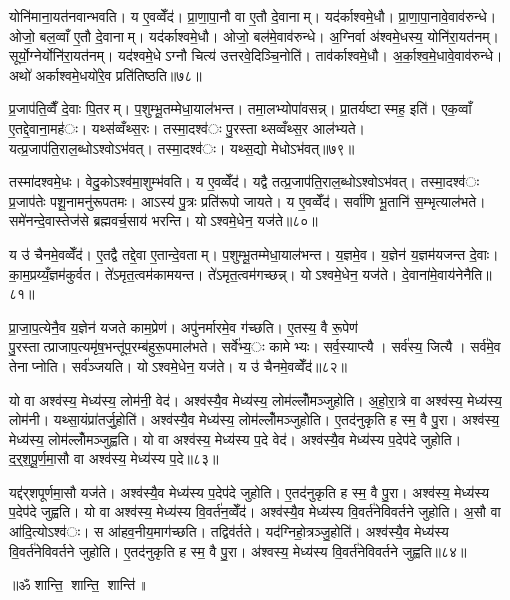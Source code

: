 योनि॑माना॒यत॑नवान्भवति। य ए॒वव्वेँद॑। प्रा॒णा॒पा॒नौ वा ए॒तौ दे॒वानाम्। यद॑र्काश्वमे॒धौ। प्रा॒णा॒पा॒नावे॒वाव॑रुन्धे। ओजो॒ बल॒व्वाँ ए॒तौ दे॒वानाम्। यद॑र्काश्वमे॒धौ। ओजो॒ बल॑मे॒वाव॑रुन्धे। अ॒ग्निर्वा अ॑श्वमे॒धस्य॒ योनि॑रा॒यत॑नम्। सूर्यो॒ग्नेर्योनि॑रा॒यत॑नम्। यद॑श्वमे॒धेऽग्नौ चित्य॑ उत्तरवे॒दिञ्चि॒नोति॑। ताव॑र्काश्वमे॒धौ। अ॒र्का॒श्व॒मे॒धावे॒वाव॑रुन्धे। अथो॑ अर्काश्वमे॒धयो॑रे॒व प्रति॑तिष्ठति॥७८॥


प्र॒जाप॑ति॒व्वैँ दे॒वाः पि॒तरम्। प॒शुम्भू॒तम्मेधा॒याल॑भन्त। तमा॒लभ्योपा॑वसन्न्। प्रा॒तर्यष्टास्मह॒ इति॑। एक॒व्वाँ ए॒तद्दे॒वाना॒मह॑ः। यथ्स॑व्वँथ्स॒रः। तस्मा॒दश्व॑ः पु॒रस्ताथ्सव्वँथ्स॒र आल॑भ्यते। यत्प्र॒जाप॑ति॒राल॒ब्धोऽश्वोऽभ॑वत्। तस्मा॒दश्व॑ः। यथ्स॒द्यो मेधोऽभ॑वत्॥७९॥

तस्मा॑दश्वमे॒धः। वेदु॒कोऽश्व॑मा॒शुम्भ॑वति। य ए॒वव्वेँद॑। यद्वै तत्प्र॒जाप॑ति॒राल॒ब्धोऽश्वोऽभ॑वत्। तस्मा॒दश्व॑ः प्र॒जाप॑तेः पशू॒नामनु॑रूपतमः। आऽस्य॑ पु॒त्रः प्रति॑रूपो जायते। य ए॒वव्वेँद॑। सर्वा॑णि भू॒तानि॑ स॒म्भृत्याल॑भते। समे॑नन्दे॒वास्तेज॑से ब्रह्मवर्च॒साय॑ भरन्ति। योऽश्वमे॒धेन॒ यज॑ते॥८०॥

य उ॑ चैनमे॒वव्वेँद॑। ए॒तद्वै तद्दे॒वा ए॒तान्दे॒वताम्। प॒शुम्भू॒तम्मेधा॒याल॑भन्त। य॒ज्ञमे॒व। य॒ज्ञेन॑ य॒ज्ञम॑यजन्त दे॒वाः। का॒म॒प्रय्यँ॒ज्ञम॑कुर्वत। ते॑ऽमृत॒त्वम॑कामयन्त। ते॑ऽमृत॒त्वम॑गच्छन्न्। योऽश्वमे॒धेन॒ यज॑ते। दे॒वाना॑मे॒वाय॑नेनैति॥८१॥

प्रा॒जा॒प॒त्येनै॒व य॒ज्ञेन॑ यजते काम॒प्रेण॑। अपु॑नर्मारमे॒व ग॑च्छति। ए॒तस्य॒ वै रू॒पेण॑ पु॒रस्तात्प्राजाप॒त्यमृ॑ष॒भन्तू॑प॒रम्ब॑हुरू॒पमाल॑भते। सर्वे॑भ्य॒ः कामेभ्यः। सर्व॒स्याप्त्यै। सर्व॑स्य॒ जित्यै। सर्व॑मे॒व तेनाप्नोति। सर्व॑ञ्जयति। योऽश्वमे॒धेन॒ यज॑ते। य उ॑ चैनमे॒वव्वेँद॑॥८२॥


यो वा अश्व॑स्य॒ मेध्य॑स्य॒ लोम॑नी॒ वेद॑। अश्व॑स्यै॒व मेध्य॑स्य॒ लोम॑ल्लोँमञ्जुहोति। अ॒हो॒रा॒त्रे वा अश्व॑स्य॒ मेध्य॑स्य॒ लोम॑नी। यथ्सा॒यंप्रा॑तर्जु॒होति॑। अश्व॑स्यै॒व मेध्य॑स्य॒ लोम॑ल्लोँमञ्जुहोति। ए॒तद॑नुकृति ह स्म॒ वै पु॒रा। अश्व॑स्य॒ मेध्य॑स्य॒ लोम॑ल्लोँमञ्जुह्वति। यो वा अश्व॑स्य॒ मेध्य॑स्य प॒दे वेद॑। अश्व॑स्यै॒व मेध्य॑स्य प॒देप॑दे जुहोति। द॒र्॒श॒पू॒र्ण॒मा॒सौ वा अश्व॑स्य॒ मेध्य॑स्य प॒दे॥८३॥

यद्द॑र्‌शपूर्णमा॒सौ यज॑ते। अश्व॑स्यै॒व मेध्य॑स्य प॒देप॑दे जुहोति। ए॒तद॑नुकृति ह स्म॒ वै पु॒रा। अश्व॑स्य॒ मेध्य॑स्य प॒देप॑दे जुह्वति। यो वा अश्व॑स्य॒ मेध्य॑स्य वि॒वर्त॑न॒व्वेँद॑। अश्व॑स्यै॒व मेध्य॑स्य वि॒वर्त॑नेविवर्तने जुहोति। अ॒सौ वा आ॑दि॒त्योऽश्व॑ः। स आ॑हव॒नीय॒माग॑च्छति। तद्विव॑र्तते। यद॑ग्निहो॒त्रञ्जु॒होति॑। अश्व॑स्यै॒व मेध्य॑स्य वि॒वर्त॑नेविवर्तने जुहोति। ए॒तद॑नुकृति ह स्म॒ वै पु॒रा। अ॑श्वस्य॒ मेध्य॑स्य वि॒वर्त॑नेविवर्तने जुह्वति॥८४॥

\centerline{॥ॐ शान्ति॒ शान्ति॒ शान्ति॑॥}
